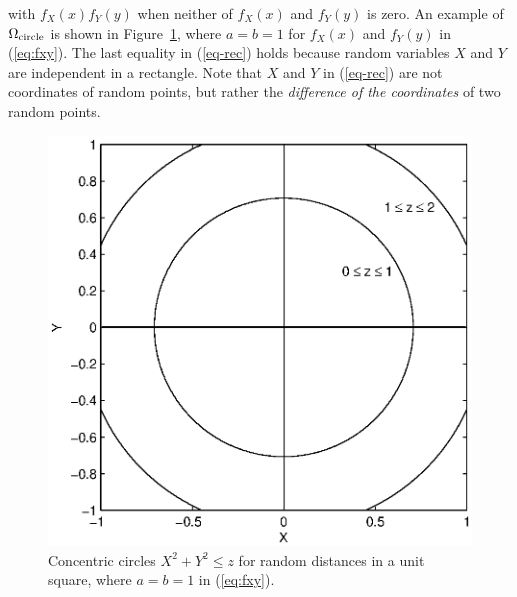 \documentclass[12pt,draftclsnofoot,onecolumn]{IEEEtran}
\begin{document}
with $f_X(x)f_Y(y)$ when neither of $f_X(x)$ and $f_Y(y)$ is zero.
An example of $\Omega_{\rm circle}$ is shown in Figure~\ref{fig:square}, 
where $a=b=1$ for $f_X(x)$ and $f_Y(y)$ in (\ref{eq:fxy}). 
The last equality in (\ref{eq-rec}) holds because random variables
$X$ and $Y$ are independent in a rectangle. Note that $X$ and $Y$ in (\ref{eq-rec})
are not coordinates of random points, but rather the \textit{difference of the coordinates} 
of two random points. 
%

\begin{figure}
  \centering
  \includegraphics[width=0.5\columnwidth]{fig/square_within}
  \caption{Concentric circles $X^2+Y^2 \leq z$ for random distances in a unit square, 
  where $a=b=1$ in (\ref{eq:fxy}).}
  \label{fig:square}
\end{figure}
\end{document}
